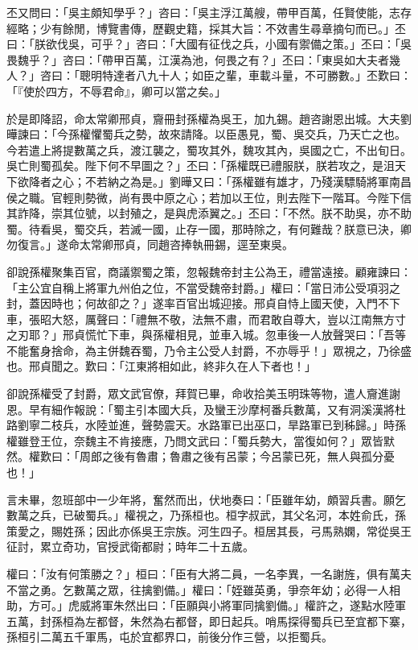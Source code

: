 丕又問曰：「吳主頗知學乎？」咨曰：「吳主浮江萬艘，帶甲百萬，任賢使能，志存經略；少有餘閒，博覽書傳，歷觀史籍，採其大旨：不效書生尋章摘句而已。」丕曰：「朕欲伐吳，可乎？」咨曰：「大國有征伐之兵，小國有禦備之策。」丕曰：「吳畏魏乎？」咨曰：「帶甲百萬，江漢為池，何畏之有？」丕曰：「東吳如大夫者幾人？」咨曰：「聰明特達者八九十人；如臣之輩，車載斗量，不可勝數。」丕歎曰：「『使於四方，不辱君命』，卿可以當之矣。」

於是即降詔，命太常卿邢貞，齎冊封孫權為吳王，加九錫。趙咨謝恩出城。大夫劉曄諫曰：「今孫權懼蜀兵之勢，故來請降。以臣愚見，蜀、吳交兵，乃天亡之也。今若遣上將提數萬之兵，渡江襲之，蜀攻其外，魏攻其內，吳國之亡，不出旬日。吳亡則蜀孤矣。陛下何不早圖之？」丕曰：「孫權既已禮服朕，朕若攻之，是沮天下欲降者之心；不若納之為是。」劉曄又曰：「孫權雖有雄才，乃殘漢驃騎將軍南昌侯之職。官輕則勢微，尚有畏中原之心；若加以王位，則去陛下一階耳。今陛下信其詐降，崇其位號，以封殖之，是與虎添翼之。」丕曰：「不然。朕不助吳，亦不助蜀。待看吳，蜀交兵，若滅一國，止存一國，那時除之，有何難哉？朕意已決，卿勿復言。」遂命太常卿邢貞，同趙咨捧執冊錫，逕至東吳。

卻說孫權聚集百官，商議禦蜀之策，忽報魏帝封主公為王，禮當遠接。顧雍諫曰：「主公宜自稱上將軍九州伯之位，不當受魏帝封爵。」權曰：「當日沛公受項羽之封，蓋因時也；何故卻之？」遂率百官出城迎接。邢貞自恃上國天使，入門不下車，張昭大怒，厲聲曰：「禮無不敬，法無不肅，而君敢自尊大，豈以江南無方寸之刃耶？」邢貞慌忙下車，與孫權相見，並車入城。忽車後一人放聲哭曰：「吾等不能奮身捨命，為主併魏吞蜀，乃令主公受人封爵，不亦辱乎！」眾視之，乃徐盛也。邢貞聞之。歎曰：「江東將相如此，終非久在人下者也！」

卻說孫權受了封爵，眾文武官僚，拜賀已畢，命收拾美玉明珠等物，遣人齎進謝恩。早有細作報說：「蜀主引本國大兵，及蠻王沙摩柯番兵數萬，又有洞溪漢將杜路劉寧二枝兵，水陸並進，聲勢震天。水路軍已出巫口，旱路軍已到秭歸。」時孫權雖登王位，奈魏主不肯接應，乃問文武曰：「蜀兵勢大，當復如何？」眾皆默然。權歎曰：「周郎之後有魯肅；魯肅之後有呂蒙；今呂蒙已死，無人與孤分憂也！」

言未畢，忽班部中一少年將，奮然而出，伏地奏曰：「臣雖年幼，頗習兵書。願乞數萬之兵，已破蜀兵。」權視之，乃孫桓也。桓字叔武，其父名河，本姓俞氏，孫策愛之，賜姓孫；因此亦係吳王宗族。河生四子。桓居其長，弓馬熟嫻，常從吳王征討，累立奇功，官授武衛都尉；時年二十五歲。

權曰：「汝有何策勝之？」桓曰：「臣有大將二員，一名李異，一名謝旌，俱有萬夫不當之勇。乞數萬之眾，往擒劉備。」權曰：「姪雖英勇，爭奈年幼；必得一人相助，方可。」虎威將軍朱然出曰：「臣願與小將軍同擒劉備。」權許之，遂點水陸軍五萬，封孫桓為左都督，朱然為右都督，即日起兵。哨馬探得蜀兵已至宜都下寨，孫桓引二萬五千軍馬，屯於宜都界口，前後分作三營，以拒蜀兵。

